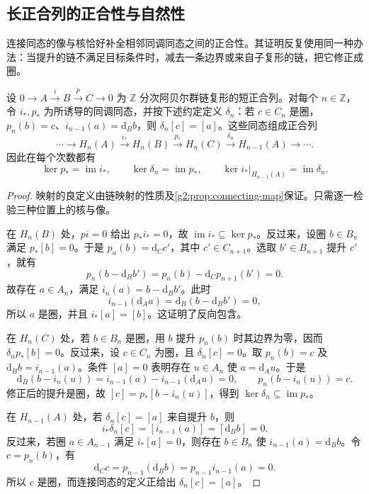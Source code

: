 \subsection{长正合列的正合性与自然性}
\label{g2:subsec:0201:04}
连接同态的像与核恰好补全相邻同调同态之间的正合性。其证明反复使用同一种办法：当提升的链不满足目标条件时，减去一条边界或来自子复形的链，把它修正成圈。

\begin{theorem}[同调长正合列]\label{g2:thm:homology-LES}
	设 \(0\to A\xrightarrow{i}B\xrightarrow{p}C\to0\) 为 \(\mathbb Z\) 分次阿贝尔群链复形的短正合列。对每个 \(n\in\mathbb Z\)，令 \(i_*,p_*\) 为所诱导的同调同态，并按下述约定定义 \(\delta_n\)：若 \(c\in C_n\) 是圈，\(p_n(b)=c\)、\(i_{n-1}(a)=\mathrm{d}_Bb\)，则 \(\delta_n[c]=[a]\)。这些同态组成正合列
	\[
		\cdots\longrightarrow H_n(A)\xrightarrow{i_*}H_n(B)
		\xrightarrow{p_*}H_n(C)\xrightarrow{\delta_n}H_{n-1}(A)
		\longrightarrow\cdots.
	\]
	因此在每个次数都有
	\[
		\ker p_*=\operatorname{im}i_*,
		\qquad\ker\delta_n=\operatorname{im}p_*,
		\qquad\ker i_*|_{H_{n-1}(A)}=\operatorname{im}\delta_n.
	\]
\end{theorem}
\begin{proof}
	映射的良定义由链映射的性质及\cref{g2:prop:connecting-map}保证。只需逐一检验三种位置上的核与像。

	在 \(H_n(B)\) 处，\(pi=0\) 给出 \(p_*i_*=0\)，故 \(\operatorname{im}i_*\subseteq\ker p_*\)。反过来，设圈 \(b\in B_n\) 满足 \(p_*[b]=0\)。于是 \(p_n(b)=\mathrm{d}_Cc'\)，其中 \(c'\in C_{n+1}\)。选取 \(b'\in B_{n+1}\) 提升 \(c'\)，就有
	\[
		p_n(b-\mathrm{d}_Bb')
		=p_n(b)-\mathrm{d}_Cp_{n+1}(b')=0.
	\]
	故存在 \(a\in A_n\)，满足 \(i_n(a)=b-\mathrm{d}_Bb'\)。此时
	\[
		i_{n-1}(\mathrm{d}_Aa)
		=\mathrm{d}_B(b-\mathrm{d}_Bb')=0,
	\]
	所以 \(a\) 是圈，并且 \(i_*[a]=[b]\)。这证明了反向包含。

	在 \(H_n(C)\) 处，若 \(b\in B_n\) 是圈，用 \(b\) 提升 \(p_n(b)\) 时其边界为零，因而 \(\delta_np_*[b]=0\)。反过来，设 \(c\in C_n\) 为圈，且 \(\delta_n[c]=0\)。取 \(p_n(b)=c\) 及 \(\mathrm{d}_Bb=i_{n-1}(a)\)。条件 \([a]=0\) 表明存在 \(u\in A_n\) 使 \(a=\mathrm{d}_Au\)。于是
	\[
		\mathrm{d}_B(b-i_n(u))
		=i_{n-1}(a)-i_{n-1}(\mathrm{d}_Au)=0,
		\qquad
		p_n(b-i_n(u))=c.
	\]
	修正后的提升是圈，故 \([c]=p_*[b-i_n(u)]\)，得到 \(\ker\delta_n\subseteq\operatorname{im}p_*\)。

	在 \(H_{n-1}(A)\) 处，若 \(\delta_n[c]=[a]\) 来自提升 \(b\)，则
	\[
		i_*\delta_n[c]=[i_{n-1}(a)]=[\mathrm{d}_Bb]=0.
	\]
	反过来，若圈 \(a\in A_{n-1}\) 满足 \(i_*[a]=0\)，则存在 \(b\in B_n\) 使 \(i_{n-1}(a)=\mathrm{d}_Bb\)。令 \(c=p_n(b)\)，有
	\[
		\mathrm{d}_Cc=p_{n-1}(\mathrm{d}_Bb)=p_{n-1}i_{n-1}(a)=0.
	\]
	所以 \(c\) 是圈，而连接同态的定义正给出 \(\delta_n[c]=[a]\)。
\end{proof}

